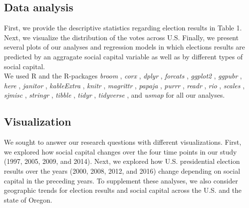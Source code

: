 \documentclass[
  english,
  man]{apa6}
\begin{document}
\hypertarget{data-analysis}{%
\subsection{Data analysis}\label{data-analysis}}

First, we provide the descriptive statistics regarding election results in Table 1. Next, we visualize the distribution of the votes across U.S. Finally, we present several plots of our analyses and regression models in which elections results are predicted by an aggragate social capital variable as well as by different types of social capital.\\
We used R \autocite[Version 4.0.2;][]{R-base} and the R-packages \emph{broom} \autocite[Version 0.7.1;][]{R-broom}, \emph{corx} \autocite[Version 1.0.6.1;][]{R-corx}, \emph{dplyr} \autocite[Version 1.0.2;][]{R-dplyr}, \emph{forcats} \autocite[Version 0.5.0;][]{R-forcats}, \emph{ggplot2} \autocite[Version 3.3.2;][]{R-ggplot2}, \emph{ggpubr} \autocite[Version 0.4.0;][]{R-ggpubr}, \emph{here} \autocite[Version 0.1;][]{R-here}, \emph{janitor} \autocite[Version 2.0.1;][]{R-janitor}, \emph{kableExtra} \autocite[Version 1.3.1;][]{R-kableExtra}, \emph{knitr} \autocite[Version 1.30;][]{R-knitr}, \emph{magrittr} \autocite[Version 1.5;][]{R-magrittr}, \emph{papaja} \autocite[Version 0.1.0.9997;][]{R-papaja}, \emph{purrr} \autocite[Version 0.3.4;][]{R-purrr}, \emph{readr} \autocite[Version 1.3.1;][]{R-readr}, \emph{rio} \autocite[Version 0.5.16;][]{R-rio}, \emph{scales} \autocite[Version 1.1.1;][]{R-scales}, \emph{sjmisc} \autocite[Version 2.8.5;][]{R-sjmisc}, \emph{stringr} \autocite[Version 1.4.0;][]{R-stringr}, \emph{tibble} \autocite[Version 3.0.3;][]{R-tibble}, \emph{tidyr} \autocite[Version 1.1.2;][]{R-tidyr}, \emph{tidyverse} \autocite[Version 1.3.0;][]{R-tidyverse}, and \emph{usmap} \autocite[Version 0.5.1;][]{R-usmap} for all our analyses.

\hypertarget{visualization}{%
\subsection{Visualization}\label{visualization}}

We sought to answer our research questions with different visualizations. First, we explored how social capital changes over the four time points in our study (1997, 2005, 2009, and 2014). Next, we explored how U.S. presidential election results over the years (2000, 2008, 2012, and 2016) change depending on social capital in the preceding years. To supplement these analyses, we also consider geographic trends for election results and social capital across the U.S. and the state of Oregon.
\end{document}
